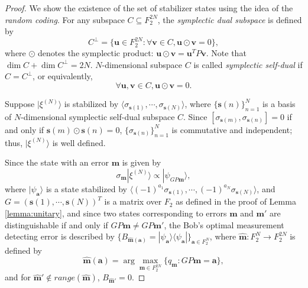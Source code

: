 \documentclass[aps,prx,twocolumn,showpacs,amsmath,notitlepage,amssymb,superscriptaddress]{revtex4-1}
\newcommand{\bra}[1]{\langle {#1} |}
\newcommand{\ket}[1]{| {#1} \rangle}
\begin{document}
\begin{proof}
We show the existence of the set of stabilizer states using the idea of the {\it random coding}.
For any subspace $C\subseteq F_2^{2N}$, the {\it symplectic dual subspace} is defined by 
\begin{equation}
 C^{\bot}=\{\mathbf{u}\in F_2^{2N}:\forall \mathbf{v}\in C,\mathbf{u}\odot\mathbf{v}=0\},
\end{equation}
where $\odot$ denotes the symplectic product: $\mathbf{u}\odot\mathbf{v}=\mathbf{u}^TP\mathbf{v}$. Note that $\dim C+\dim C^{\bot}=2N$. $N$-dimensional subspace $C$ is called {\it symplectic self-dual} if $C=C^{\bot}$, or equivalently,
\begin{equation}
 \forall \mathbf{u},\mathbf{v}\in C, \mathbf{u}\odot \mathbf{v}=0.
\end{equation}

Suppose $\ket{\xi^{(N)}}$ is stabilized by $\langle \sigma_{\mathbf{s}(1)},\cdots,\sigma_{\mathbf{s}(N)}\rangle$, where $\{\mathbf{s}(n)\}_{n=1}^N$ is a basis of $N$-dimensional symplectic self-dual subspace $C$. Since $[\sigma_{\mathbf{s}(m)},\sigma_{\mathbf{s}(n)}]=0$ if and only if $\mathbf{s}(m)\odot\mathbf{s}(n)=0$, $\{\sigma_{\mathbf{s}(n)}\}_{n=1}^N$ is commutative and independent; thus, $\ket{\xi^{(N)}}$ is well defined.
 
Since the state with an error $\mathbf{m}$ is given by
\begin{equation}
 \sigma_{\mathbf{m}}\ket{\xi^{(N)}}\propto\ket{\psi_{GP\mathbf{m}}},
\end{equation}
where $\ket{\psi_{\mathbf{a}}}$ is a state stabilized by $\langle (-1)^{a_1}\sigma_{\mathbf{s}(1)},\cdots,(-1)^{a_N}\sigma_{\mathbf{s}(N)}\rangle$, and $G=(\mathbf{s}(1),\cdots,\mathbf{s}(N))^T$ is a matrix over $F_2$ as defined in the proof of Lemma \ref{lemma:unitary}, and since two states corresponding to errors $\mathbf{m}$ and $\mathbf{m}'$ are distinguishable if and only if $GP\mathbf{m}\neq GP\mathbf{m}'$, the Bob's optimal measurement detecting error is described by $\{B_{\hat{\mathbf{m}}(\mathbf{a})}=\ket{\psi_{\mathbf{a}}}\bra{\psi_{\mathbf{a}}}\}_{\mathbf{a}\in F_2^{N}}$, where $\hat{\mathbf{m}}:F_2^N\rightarrow F_2^{2N}$ is defined by
\begin{equation}
 \hat{\mathbf{m}}(\mathbf{a})=\arg\max_{\mathbf{m}\in F_2^{2N}}\{q_{\mathbf{m}}:GP\mathbf{m}=\mathbf{a}\},
\end{equation}
and for $\hat{\mathbf{m}}'\notin range(\hat{\mathbf{m}})$, $B_{\hat{\mathbf{m}}'}=0$.


\end{proof}
\end{document}
